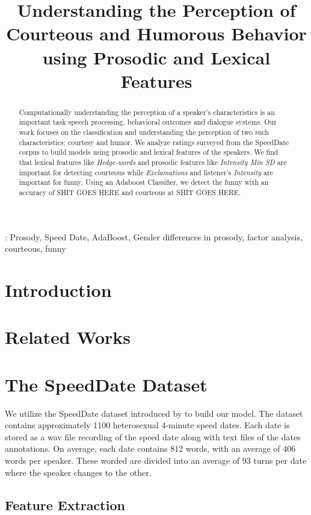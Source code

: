 \documentclass[a4paper]{article}
\title{Understanding the Perception of Courteous and Humorous Behavior using Prosodic and Lexical Features}
\begin{document}
\maketitle
%

\begin{abstract}
Computationally understanding the perception of a speaker's characteristics is an important task speech processing, behavioral outcomes and dialogue systems. Our work focuses on the classification and understanding the perception of two such characteristics: courtesy and humor. We analyze ratings surveyed from the SpeedDate corpus to build models using prosodic and lexical features of the speakers. We find that lexical features like \textit{Hedge-words} and prosodic features like \textit{Intensity Min SD} are important for detecting courteous while \textit{Exclamations} and listener's \textit{Intensity} are important for funny. Using an Adaboost Classifier, we detect the funny with an accuracy of SHIT GOES HERE and courteous at SHIT GOES HERE.\\

\end{abstract}

: Prosody, Speed Date, AdaBoost, Gender differences in prosody, factor analysis, courteous, funny

%

\section{Introduction}

\section{Related Works}


\section{The SpeedDate Dataset}
We utilize the SpeedDate dataset introduced by \cite{jurafsky} to build our model. The dataset contains approximately 1100 heterosexual 4-minute speed dates. Each date is stored as a wav file recording of the speed date along with text files of the dates annotations. On average, each date contains 
812 words, with an average of 406 words per speaker. These worded are divided into an average of 93 turns per date where the speaker changes to the other.

\subsection{Feature Extraction}
\end{document}
